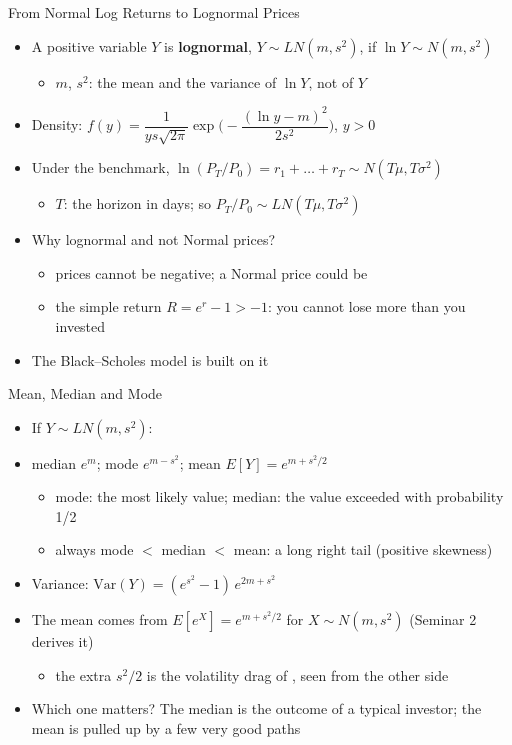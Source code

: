 \begin{frame}{From Normal Log Returns to Lognormal Prices}
\itemsize{\small}
\begin{itemize}
    \item A positive variable $Y$ is \textbf{lognormal}, $Y \sim LN(m, s^2)$, if $\ln Y \sim N(m, s^2)$
    \begin{itemize}
        \item $m$, $s^2$: the mean and the variance of $\ln Y$, not of $Y$
    \end{itemize}
    \item Density: $f(y) = \dfrac{1}{y s\sqrt{2\pi}} \exp\Big(-\dfrac{(\ln y - m)^2}{2s^2}\Big)$, \quad $y > 0$
    \item Under the benchmark, $\ln(P_T/P_0) = r_1 + \dots + r_T \sim N(T\mu, T\sigma^2)$
    \begin{itemize}
        \item $T$: the horizon in days; so $P_T/P_0 \sim LN(T\mu, T\sigma^2)$ 
    \end{itemize}
    \item Why lognormal and not Normal prices?
    \begin{itemize}
        \item prices cannot be negative; a Normal price could be
        \item the simple return $R = e^r - 1 > -1$: you cannot lose more than you invested
    \end{itemize}
    \item The Black--Scholes model is built on it
\end{itemize}
\end{frame}

\begin{frame}{Mean, Median and Mode}
\itemsize{\small}
\begin{itemize}
    \item If $Y \sim LN(m, s^2)$:
    \item median $e^{m}$; mode $e^{m - s^2}$; mean $E[Y] = e^{m + s^2/2}$
    \begin{itemize}
        \item mode: the most likely value; median: the value exceeded with probability 1/2
        \item always mode $<$ median $<$ mean: a long right tail (positive skewness)
    \end{itemize}
    \item Variance: $\text{Var}(Y) = (e^{s^2} - 1)\,e^{2m + s^2}$
    \item The mean comes from $E[e^X] = e^{m + s^2/2}$ for $X \sim N(m, s^2)$ (Seminar 2 derives it)
    \begin{itemize}
        \item the extra $s^2/2$ is the volatility drag of , seen from the other side
    \end{itemize}
    \item Which one matters? The median is the outcome of a typical investor; the mean is pulled up by a few very good paths
\end{itemize}
\end{frame}

